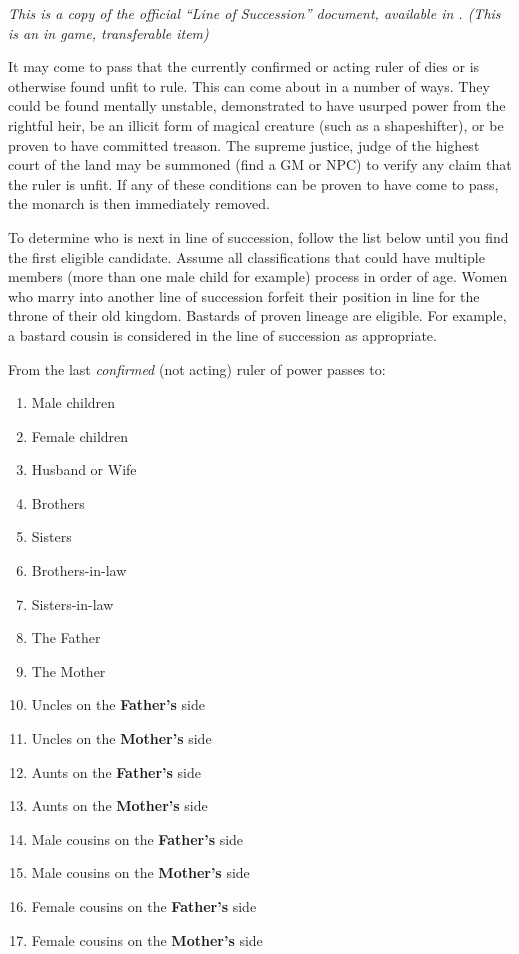 \documentclass[white]{NeptuneBall}
\begin{document}
\name{\wInheritance{}}

\emph{This is a copy of the official ``Line of Succession'' document, available in \sMuseum{}. (This is an in game, transferable item)}

It may come to pass that the currently confirmed or acting ruler of \pAtlantis{} dies or is otherwise found unfit to rule. This can come about in a number of ways. They could be found mentally unstable, demonstrated to have usurped power from the rightful heir, be an illicit form of magical creature (such as a shapeshifter), or be proven to have committed treason. The supreme justice, judge of the highest court of the land may be summoned (find a GM or NPC) to verify any claim that the ruler is unfit. If any of these conditions can be proven to have come to pass, the monarch is then immediately removed. 

To determine who is next in line of succession, follow the list below until you find the first eligible candidate. Assume all classifications that could have multiple members (more than one male child for example) process in order of age. Women who marry into another line of succession forfeit their position in line for the throne of their old kingdom. Bastards of proven lineage are eligible. For example, a bastard cousin is considered in the line of succession as appropriate.

From the last \emph{confirmed} (not acting) ruler of \pAtlantis{} power passes to:

\begin{enumerate}
\item Male children
\item Female children
\item Husband or Wife
\item Brothers 
\item Sisters
\item Brothers-in-law
\item Sisters-in-law
\item The Father
\item The Mother
\item Uncles on the {\bf Father's} side
\item Uncles on the {\bf Mother's} side
\item Aunts on the {\bf Father's} side
\item Aunts on the {\bf Mother's} side
\item Male cousins on the {\bf Father's} side
\item Male cousins on the {\bf Mother's} side
\item Female cousins on the {\bf Father's} side
\item Female cousins on the {\bf Mother's} side
\end{enumerate}
\end{document}
